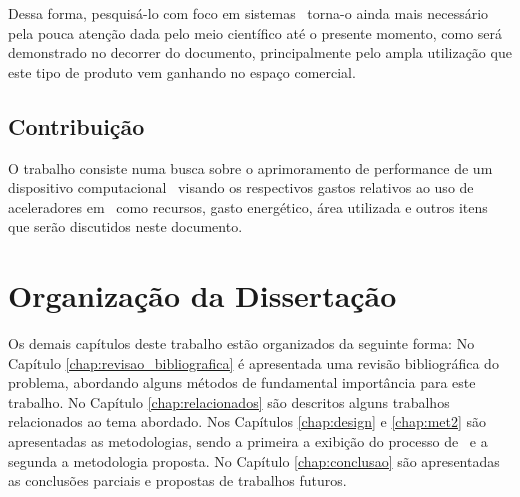 	Dessa forma, pesquisá-lo com foco em sistemas \wearable\ torna-o ainda mais necessário pela pouca atenção dada pelo meio científico até o presente momento, como será demonstrado no decorrer do documento, principalmente pelo ampla utilização que este tipo de produto vem ganhando no espaço comercial.


   \subsection{Contribuição}
    
      O trabalho consiste numa busca sobre o aprimoramento de performance de um dispositivo computacional \wearable\ visando os respectivos gastos relativos ao uso de aceleradores em \hardware\ como recursos, gasto energético, área utilizada e outros itens que serão discutidos neste documento. 
       

\section{Organização da Dissertação}
	Os demais capítulos deste trabalho estão organizados da seguinte forma: 
   No Capítulo \ref{chap:revisao_bibliografica} é apresentada uma revisão bibliográfica do problema, abordando alguns métodos de fundamental importância para este trabalho. 
   No Capítulo \ref{chap:relacionados} são descritos alguns trabalhos relacionados ao tema abordado. 
   Nos Capítulos \ref{chap:design} e \ref{chap:met2} são apresentadas as metodologias, sendo a primeira a exibição do processo de \design\ e a segunda a metodologia proposta. 
   No Capítulo \ref{chap:conclusao} são apresentadas as conclusões parciais e propostas de trabalhos futuros.